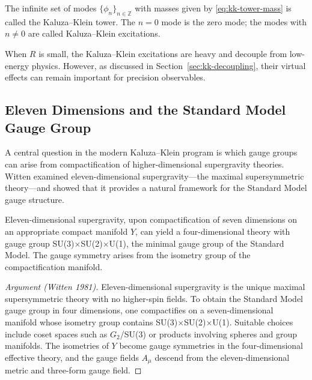 \begin{definition}
\label{def:kk-tower}
The infinite set of modes \(\{\phi_n\}_{n\in\mathbb{Z}}\) with masses given by
\eqref{eq:kk-tower-mass} is called the Kaluza--Klein tower.  The \(n=0\) mode is
the zero mode; the modes with \(n \neq 0\) are called Kaluza--Klein excitations.
\end{definition}

When \(R\) is small, the Kaluza--Klein excitations are heavy and decouple from
low-energy physics.  However, as discussed in Section~\ref{sec:kk-decoupling},
their virtual effects can remain important for precision observables.

\subsection{Eleven Dimensions and the Standard Model Gauge Group}

A central question in the modern Kaluza--Klein program is which gauge groups can
arise from compactification of higher-dimensional supergravity theories.  Witten
\cite{Witten1981} examined eleven-dimensional supergravity---the maximal
supersymmetric theory---and showed that it provides a natural framework for the
Standard Model gauge structure.

\begin{theorem}[Witten: D=11 and the Standard Model gauge group]
\label{thm:witten-d11-minimal-gauge-group}
Eleven-dimensional supergravity, upon compactification of seven dimensions on an
appropriate compact manifold \(Y\), can yield a four-dimensional theory with gauge
group SU(3)\(\times\)SU(2)\(\times\)U(1), the minimal gauge group of the Standard
Model.  The gauge symmetry arises from the isometry group of the compactification
manifold.
\end{theorem}

\begin{proof}[Argument (Witten 1981)]
Eleven-dimensional supergravity is the unique maximal supersymmetric theory with
no higher-spin fields.  To obtain the Standard Model gauge group in four dimensions,
one compactifies on a seven-dimensional manifold whose isometry group contains
SU(3)\(\times\)SU(2)\(\times\)U(1).  Suitable choices include coset spaces
such as \(G_2\)/SU(3) or products involving spheres and group manifolds.  The
isometries of \(Y\) become gauge symmetries in the four-dimensional effective
theory, and the gauge fields \(A_\mu\) descend from the eleven-dimensional metric
and three-form gauge field.
\end{proof}

